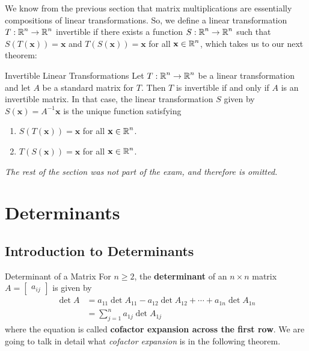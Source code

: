 \documentclass{article}
\begin{document}
We know from the previous section that matrix multiplications are essentially compositions of linear transformations. So, we define a linear transformation $T: \operatorname{\mathbb{R}}^n \to \operatorname{\mathbb{R}}^n$ invertible if there exists a function $S: \operatorname{\mathbb{R}}^n \to \operatorname{\mathbb{R}}^n$ such that $S(T(\mathbf{x})) = \mathbf{x}$ and $T(S(\mathbf{x})) = \mathbf{x}$ for all $\mathbf{x} \in \operatorname{\mathbb{R}}^n$, which takes us to our next theorem:

\begin{theorem}{Invertible Linear Transformations}
	Let $T: \operatorname{\mathbb{R}}^n \to \operatorname{\mathbb{R}}^n$ be a linear transformation and let $A$ be a standard matrix for $T$. Then $T$ is invertible if and only if $A$ is an invertible matrix. In that case, the linear transformation $S$ given by $S(\mathbf{x}) = A^{-1}\mathbf{x}$ is the unique function satisfying

	\begin{enumerate}[label=\alph*)]
		\item
		      $S(T(\mathbf{x})) = \mathbf{x}$ for all $\mathbf{x} \in \operatorname{\mathbb{R}}^n$.
		\item
		      $T(S(\mathbf{x})) = \mathbf{x}$ for all $\mathbf{x} \in \operatorname{\mathbb{R}}^n$.
	\end{enumerate}
\end{theorem}
\emph{The rest of the section was not part of the exam, and therefore is omitted.}

\section{Determinants}

\subsection{Introduction to Determinants}
\begin{definition}{Determinant of a Matrix}
	For $n \geq 2$, the \textbf{determinant} of an $n \times n$ matrix $A = \begin{bmatrix} a_{ij}\end{bmatrix}$ is given by
	\begin{equation}
		\begin{split}
			\det A & = a_{11}\det A_{11} - a_{12}\det A_{12} + \cdots + a_{1n}\det A_{1n} \\
			       & = \sum_{j = 1}^{n} a_{1j}\det A_{1j}
		\end{split}
	\end{equation}
	where the equation is called \textbf{cofactor expansion across the first row}. We are going to talk in detail what \emph{cofactor expansion} is in the following theorem.
\end{definition}
\end{document}
